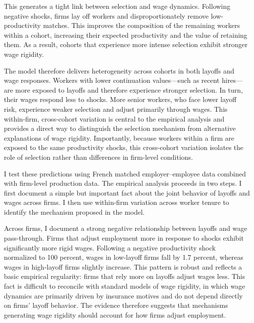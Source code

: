 This generates a tight link between selection and wage dynamics. Following negative shocks, firms lay off workers and disproportionately remove low-productivity matches. This improves the composition of the remaining workers within a cohort, increasing their expected productivity and the value of retaining them. As a result, cohorts that experience more intense selection exhibit stronger wage rigidity.

The model therefore delivers heterogeneity across cohorts in both layoffs and wage responses. Workers with lower continuation values—such as recent hires—are more exposed to layoffs and therefore experience stronger selection. In turn, their wages respond less to shocks. More senior workers, who face lower layoff risk, experience weaker selection and adjust primarily through wages. This within-firm, cross-cohort variation is central to the empirical analysis and provides a direct way to distinguish the selection mechanism from alternative explanations of wage rigidity. Importantly, because workers within a firm are exposed to the same productivity shocks, this cross-cohort variation isolates the role of selection rather than differences in firm-level conditions.

I test these predictions using French matched employer–employee data combined with firm-level production data. The empirical analysis proceeds in two steps. I first document a simple but important fact about the joint behavior of layoffs and wages across firms. I then use within-firm variation across worker tenure to identify the mechanism proposed in the model.

Across firms, I document a strong negative relationship between layoffs and wage pass-through. Firms that adjust employment more in response to shocks exhibit significantly more rigid wages. Following a negative productivity shock normalized to 100 percent, wages in low-layoff firms fall by 1.7 percent, whereas wages in high-layoff firms slightly increase. This pattern is robust and reflects a basic empirical regularity: firms that rely more on layoffs adjust wages less. This fact is difficult to reconcile with standard models of wage rigidity, in which wage dynamics are primarily driven by insurance motives and do not depend directly on firms’ layoff behavior. The evidence therefore suggests that mechanisms generating wage rigidity should account for how firms adjust employment.


